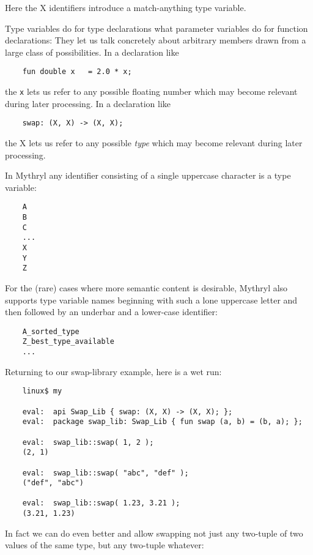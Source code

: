 Here the X identifiers introduce a match-anything type variable.

Type variables do for type declarations what 
parameter variables do for function declarations: They let us 
talk concretely about arbitrary members drawn from a large 
class of possibilities.  In a declaration like

\begin{verbatim}
    fun double x   = 2.0 * x;
\end{verbatim}

the {\tt x} lets us refer to any possible floating number which may 
become relevant during later processing.  In a declaration like

\begin{verbatim}
    swap: (X, X) -> (X, X);
\end{verbatim}

the X lets us refer to any possible {\it type} which may become 
relevant during later processing.

In Mythryl any identifier consisting of a single uppercase character is 
a type variable:

\begin{verbatim}
    A
    B
    C
    ...
    X
    Y
    Z
\end{verbatim}

For the (rare) cases where more semantic content is desirable, Mythryl 
also supports type variable names beginning with such a lone uppercase 
letter and then followed by an underbar and a lower-case identifier:

\begin{verbatim}
    A_sorted_type
    Z_best_type_available
    ...
\end{verbatim}

Returning to our swap-library example, here is a wet run:

\begin{verbatim}
    linux$ my

    eval:  api Swap_Lib { swap: (X, X) -> (X, X); };
    eval:  package swap_lib: Swap_Lib { fun swap (a, b) = (b, a); };

    eval:  swap_lib::swap( 1, 2 );
    (2, 1)

    eval:  swap_lib::swap( "abc", "def" );
    ("def", "abc")

    eval:  swap_lib::swap( 1.23, 3.21 );
    (3.21, 1.23)
\end{verbatim}

In fact we can do even better and allow swapping 
not just any two-tuple of two values of the same type, 
but any two-tuple whatever:

